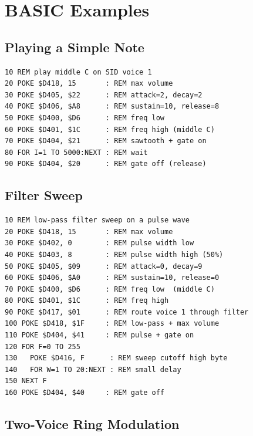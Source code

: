 \section{BASIC Examples}
\label{sec:sid-examples}

\subsection*{Playing a Simple Note}

\begin{lstlisting}
10 REM play middle C on SID voice 1
20 POKE $D418, 15       : REM max volume
30 POKE $D405, $22      : REM attack=2, decay=2
40 POKE $D406, $A8      : REM sustain=10, release=8
50 POKE $D400, $D6      : REM freq low
60 POKE $D401, $1C      : REM freq high (middle C)
70 POKE $D404, $21      : REM sawtooth + gate on
80 FOR I=1 TO 5000:NEXT : REM wait
90 POKE $D404, $20      : REM gate off (release)
\end{lstlisting}

\subsection*{Filter Sweep}

\begin{lstlisting}
10 REM low-pass filter sweep on a pulse wave
20 POKE $D418, 15       : REM max volume
30 POKE $D402, 0        : REM pulse width low
40 POKE $D403, 8        : REM pulse width high (50%)
50 POKE $D405, $09      : REM attack=0, decay=9
60 POKE $D406, $A0      : REM sustain=10, release=0
70 POKE $D400, $D6      : REM freq low  (middle C)
80 POKE $D401, $1C      : REM freq high
90 POKE $D417, $01      : REM route voice 1 through filter
100 POKE $D418, $1F     : REM low-pass + max volume
110 POKE $D404, $41     : REM pulse + gate on
120 FOR F=0 TO 255
130   POKE $D416, F      : REM sweep cutoff high byte
140   FOR W=1 TO 20:NEXT : REM small delay
150 NEXT F
160 POKE $D404, $40     : REM gate off
\end{lstlisting}

\subsection*{Two-Voice Ring Modulation}

